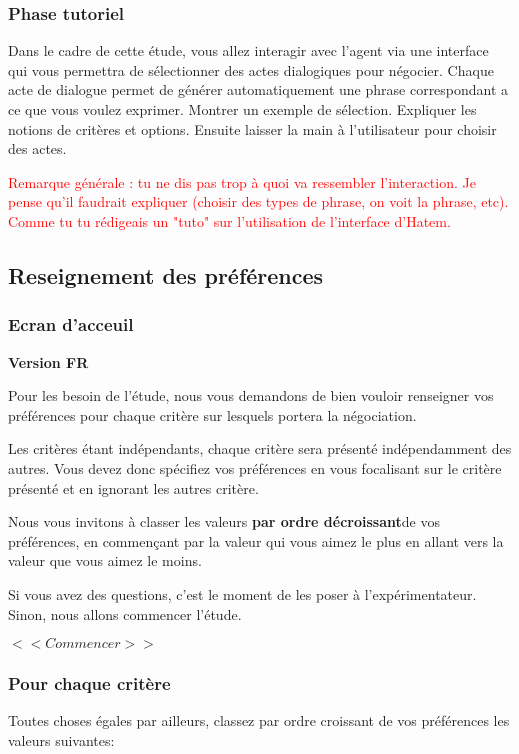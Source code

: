 \documentclass [french]{paper}
\begin{document}
				\subsubsection{Phase tutoriel}
				Dans le cadre de cette étude, vous allez interagir avec l'agent via une interface qui vous permettra de sélectionner des actes dialogiques pour négocier. 
				Chaque acte de dialogue permet de générer automatiquement une phrase correspondant a ce que vous voulez exprimer.
				Montrer un exemple de sélection. Expliquer les notions de critères et options. Ensuite laisser la main à l'utilisateur pour choisir des actes.  
				
				
				
				\textcolor{red}{Remarque générale : tu ne dis pas trop à quoi va ressembler l'interaction. Je pense qu'il faudrait expliquer (choisir des types de phrase, on voit la phrase, etc). Comme tu tu rédigeais un "tuto" sur l'utilisation de l'interface d'Hatem. }
				
					\subsection{Reseignement des préférences}
					\subsubsection{Ecran d'acceuil}
					
					\textbf{Version FR}
					
					
					Pour les besoin de l'étude, nous vous demandons de bien vouloir renseigner vos préférences pour chaque critère sur lesquels portera la négociation.
					
					Les critères étant indépendants, chaque critère sera présenté indépendamment des autres. Vous devez donc spécifiez vos préférences en vous focalisant sur le critère présenté et en ignorant les autres critère.
					
					Nous vous invitons à classer les valeurs \textbf{par ordre décroissant}de vos préférences, en commençant par la valeur qui vous aimez le plus en allant vers la valeur que vous aimez le moins.
					
					Si vous avez des questions, c'est le moment de les poser à l'expérimentateur. Sinon, nous allons commencer l'étude.
					
					$<<Commencer>>$
					
					
					\subsubsection{Pour chaque critère}
					Toutes choses égales par ailleurs, classez par ordre croissant de vos préférences les valeurs suivantes: 
					
	
\end{document}
